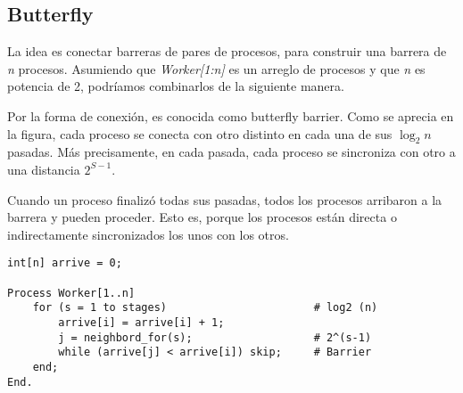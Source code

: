\documentclass[a4paper, 10pt]{report}
\begin{document}
\subsection{Butterfly}
La idea es conectar barreras de pares de procesos, para construir una barrera de \emph{n} procesos. Asumiendo que \emph{Worker[1:n]} es un arreglo de procesos y que \emph{n} es potencia de 2, podríamos combinarlos de la siguiente manera.

Por la forma de conexión, es conocida como butterfly barrier. Como se aprecia en la figura, cada proceso se conecta con otro distinto en cada una de sus $\log_2n$ pasadas. Más precisamente, en cada pasada, cada proceso se sincroniza con otro a una distancia $2^{S-1}$.

Cuando un proceso finalizó todas sus pasadas, todos los procesos arribaron a la barrera y pueden proceder. Esto es, porque los procesos están directa o indirectamente sincronizados los unos con los otros.

\begin{lstlisting}
int[n] arrive = 0;

Process Worker[1..n]
    for (s = 1 to stages)                       # log2 (n)
        arrive[i] = arrive[i] + 1;
        j = neighbord_for(s);                   # 2^(s-1)
        while (arrive[j] < arrive[i]) skip;     # Barrier
    end;
End.
\end{lstlisting}

\end{document}
